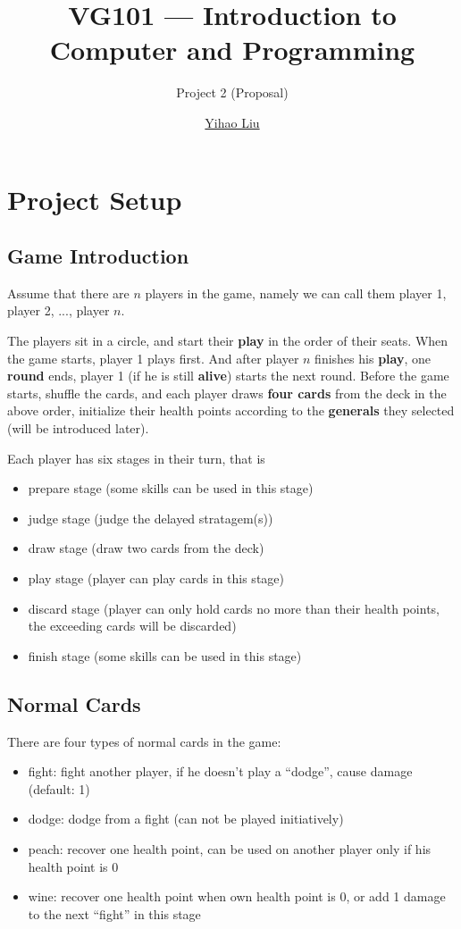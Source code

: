 \documentclass[11pt,a4paper]{article}
\title{VG101 --- Introduction to\\ Computer and Programming}
\subtitle{Project 2 (Proposal)}
\author{\href{mailto:liuyh615@sjtu.edu.cn}{Yihao Liu}}
\begin{document}
\maketitle

\section{Project Setup}

\subsection{Game Introduction}

Assume that there are $n$ players in the game, namely we can call them player 1, player 2, ..., player $n$. \bigskip

The players sit in a circle, and start their \textbf{play} in the order of their seats. When the game starts, player 1 plays first. And after player $n$ finishes his \textbf{play}, one \textbf{round} ends, player 1 (if he is still \textbf{alive}) starts the next round. Before the game starts, shuffle the cards, and each player draws \textbf{four cards} from the deck in the above order, initialize their health points according to the \textbf{generals} they selected (will be introduced later). \bigskip

Each player has six stages in their turn, that is
\begin{itemize}
\item prepare stage (some skills can be used in this stage)
\item judge stage (judge the delayed stratagem(s))
\item draw stage (draw two cards from the deck)
\item play stage (player can play cards in this stage)
\item discard stage (player can only hold cards no more than their health points, the exceeding cards will be discarded)
\item finish stage (some skills can be used in this stage)
\end{itemize}

\subsection{Normal Cards}

There are four types of normal cards in the game:
\begin{itemize}
\item fight: fight another player, if he doesn't play a ``dodge'', cause damage (default: 1)
\item dodge: dodge from a fight (can not be played initiatively)
\item peach: recover one health point, can be used on another player only if his health point is 0
\item wine: recover one health point when own health point is 0, or add 1 damage to the next ``fight'' in this stage
\end{itemize}
\end{document}
